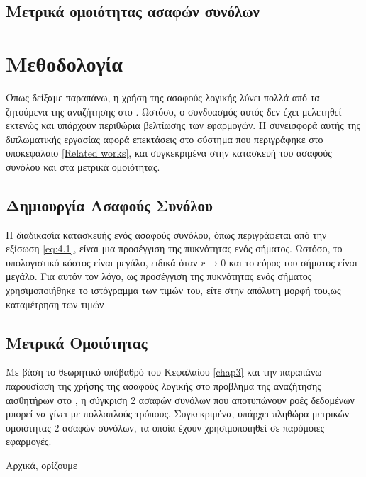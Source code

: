 \subsection{Μετρικά ομοιότητας ασαφών συνόλων}

\section{Μεθοδολογία}
Όπως δείξαμε παραπάνω, η χρήση της ασαφούς λογικής λύνει πολλά από τα ζητούμενα της αναζήτησης στο .
Ωστόσο, ο συνδυασμός αυτός δεν έχει μελετηθεί εκτενώς και υπάρχουν περιθώρια βελτίωσης των εφαρμογών.
Η συνεισφορά αυτής της διπλωματικής εργασίας αφορά επεκτάσεις στο σύστημα που περιγράφηκε στο υποκεφάλαιο \ref{Related works}, και συγκεκριμένα στην κατασκευή του ασαφούς συνόλου και στα μετρικά ομοιότητας.

\subsection{Δημιουργία Ασαφούς Συνόλου}

Η διαδικασία κατασκευής ενός ασαφούς συνόλου, όπως περιγράφεται από την εξίσωση \ref{eq:4.1}, είναι μια προσέγγιση της πυκνότητας ενός σήματος.
Ωστόσο, το υπολογιστικό κόστος είναι μεγάλο, ειδικά όταν \(r \rightarrow 0\) και το εύρος του σήματος είναι μεγάλο.
Για αυτόν τον λόγο, ως προσέγγιση της πυκνότητας ενός σήματος χρησιμοποιήθηκε το ιστόγραμμα των τιμών του, είτε στην απόλυτη μορφή του,ως καταμέτρηση των τιμών 

\subsection{Μετρικά Ομοιότητας}
Με βάση το θεωρητικό υπόβαθρό του Κεφαλαίου \ref{chap3} και την παραπάνω παρουσίαση της χρήσης της ασαφούς λογικής στο πρόβλημα της αναζήτησης αισθητήρων στο , η σύγκριση 2 ασαφών συνόλων που αποτυπώνουν ροές δεδομένων μπορεί να γίνει με πολλαπλούς τρόπους.
Συγκεκριμένα, υπάρχει πληθώρα μετρικών ομοιότητας 2 ασαφών συνόλων, τα οποία έχουν χρησιμοποιηθεί σε παρόμοιες εφαρμογές.
\par
Αρχικά, ορίζουμε 
